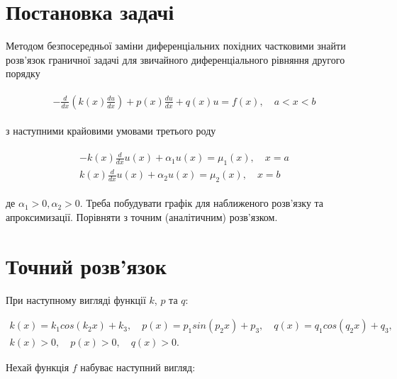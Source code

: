 \section{Постановка задачі}

Методом безпосередньої заміни диференціальних похідних частковими знайти розв’язок граничної задачі для звичайного диференціального рівняння другого порядку

\begin{align} \label{global:problem}  
\begin{split}
-\frac{d}{dx} \left( k(x)\frac{du}{dx} \right) + p(x)\frac{du}{dx} + q(x)u = f(x), \quad a < x < b
\end{split}					
\end{align}

з наступними крайовими умовами третього роду

\begin{align} \label{global:conditions}  
\begin{split}
-k(x)\frac{d}{dx}u(x) + \alpha_1 u(x) = \mu_1(x), \quad x = a \\
k(x)\frac{d}{dx}u(x) + \alpha_2 u(x) = \mu_2(x), \quad x = b
\end{split}					
\end{align}

де $\alpha_1 > 0, \alpha_2 > 0$. Треба побудувати графік для наближеного розв'язку та апроксимизації. Порівняти з точним (аналітичним) розв'язком.



\section{Точний розв'язок}

При наступному вигляді функції $k$, $p$ та $q$:

\begin{equation} \label{anal:coefficients}  
\begin{split}
k(x) = k_1 cos(k_2 x) + k_3, \quad
p(x) = p_1 sin(p_2 x) + p_3, \quad 
q(x) = q_1 cos(q_2 x) + q_3, \\
k(x) > 0, \quad p(x) > 0, \quad q(x) > 0.
\end{split}					
\end{equation}

Нехай функція $f$ набуває наступний вигляд:

